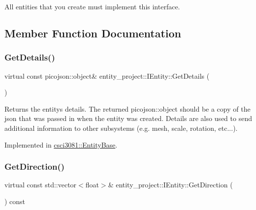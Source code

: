 All entities that you create must implement this interface. 

\subsection{Member Function Documentation}
\mbox{\label{classentity__project_1_1IEntity_a73c5b6deac9e2659160d2952ae7572c4}} 
\subsubsection{\texorpdfstring{Get\+Details()}{GetDetails()}}
{\footnotesize\ttfamily virtual const picojson\+::object\& entity\+\_\+project\+::\+I\+Entity\+::\+Get\+Details (\begin{DoxyParamCaption}{ }\end{DoxyParamCaption})\hspace{0.3cm}{\ttfamily [pure virtual]}}

Returns the entity\textquotesingle{}s details. The returned picojson\+::object should be a copy of the json that was passed in when the entity was created. Details are also used to send additional information to other subsystems (e.\+g. mesh, scale, rotation, etc...). 

Implemented in \hyperlink{classcsci3081_1_1EntityBase_aed18a7db12bfc8d6908ac6c28078110c}{csci3081\+::\+Entity\+Base}.

\mbox{\label{classentity__project_1_1IEntity_a385dad034b5a86666df9fc979a3d1d1b}} 
\subsubsection{\texorpdfstring{Get\+Direction()}{GetDirection()}}
{\footnotesize\ttfamily virtual const std\+::vector$<$float$>$\& entity\+\_\+project\+::\+I\+Entity\+::\+Get\+Direction (\begin{DoxyParamCaption}{ }\end{DoxyParamCaption}) const\hspace{0.3cm}{\ttfamily [pure virtual]}}

